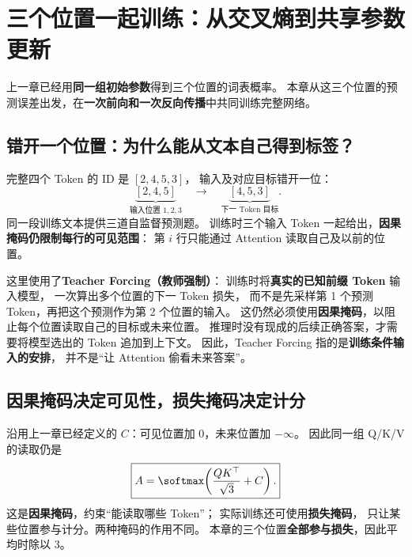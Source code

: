 \chapterrule
\section{三个位置一起训练：从交叉熵到共享参数更新}
\label{intro:22c-language-training}
上一章已经用\textbf{同一组初始参数}得到三个位置的词表概率。
本章从这三个位置的预测误差出发，在\textbf{一次前向和一次反向传播}中共同训练完整网络。

\subsection{错开一个位置：为什么能从文本自己得到标签？}
\label{concept:shifted-targets}

完整四个 Token 的 ID 是 $[2,4,5,3]$，
输入及对应目标错开一位：
\[
\underbrace{[2,4,5]}_{\text{输入位置 }1,2,3}
\quad\longrightarrow\quad
\underbrace{[4,5,3]}_{\text{下一 Token 目标}}.
\]
同一段训练文本提供三道自监督预测题。
训练时三个输入 Token 一起给出，\textbf{因果掩码仍限制每行的可见范围}：
第 $i$ 行只能通过 Attention 读取自己及以前的位置。

\label{concept:teacher-forcing}
这里使用了\textbf{Teacher Forcing（教师强制）}：
训练时将\textbf{真实的已知前缀 Token} 输入模型，
一次算出多个位置的下一 Token 损失，
而不是先采样第 1 个预测 Token，再把这个预测作为第 2 个位置的输入。
这仍然必须使用\textbf{因果掩码}，以阻止每个位置读取自己的目标或未来位置。
推理时没有现成的后续正确答案，才需要将模型选出的 Token 追加到上下文。
因此，Teacher Forcing 指的是\textbf{训练条件输入的安排}，
并不是“让 Attention 偷看未来答案”。

\subsection{因果掩码决定可见性，损失掩码决定计分}
\label{concept:loss-mask}

沿用上一章已经定义的 $C$：可见位置加 $0$，未来位置加 $-\infty$。
因此同一组 Q/K/V 的读取仍是
\begin{equation}
\boxed{A=\softmax\!\left(\frac{QK^\top}{\sqrt3}+C\right).}
\label{eq:masked-language-model}
\end{equation}
这是\textbf{因果掩码}，约束“能读取哪些 Token”；
实际训练还可使用\textbf{损失掩码}，
只让某些位置参与计分。两种掩码的作用不同。
本章的三个位置\textbf{全部参与损失}，因此平均时除以 $3$。

